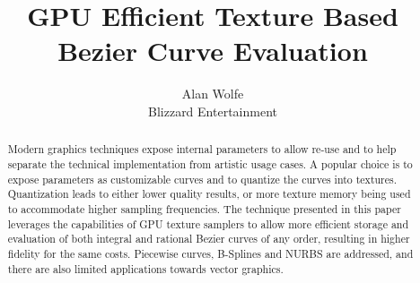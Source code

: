 \documentclass{jcgt}
\begin{document}
\usetikzlibrary{arrows.meta}

\title{GPU Efficient Texture Based Bezier Curve Evaluation}

\author
       {Alan Wolfe\\Blizzard Entertainment}


\maketitle
\thispagestyle{firstpagestyle}

\begin{abstract}
\small
Modern graphics techniques expose internal parameters to allow re-use and to help separate the technical implementation from artistic usage cases.  A popular choice is to expose parameters as customizable curves and to quantize the curves into textures.  Quantization leads to either lower quality results, or more texture memory being used to accommodate higher sampling frequencies.  The technique presented in this paper leverages the capabilities of GPU texture samplers to allow more efficient storage and evaluation of both integral and rational Bezier curves of any order, resulting in higher fidelity for the same costs.  Piecewise curves, B-Splines and NURBS are addressed, and there are also limited applications towards vector graphics.
\end{abstract}
\end{document}
